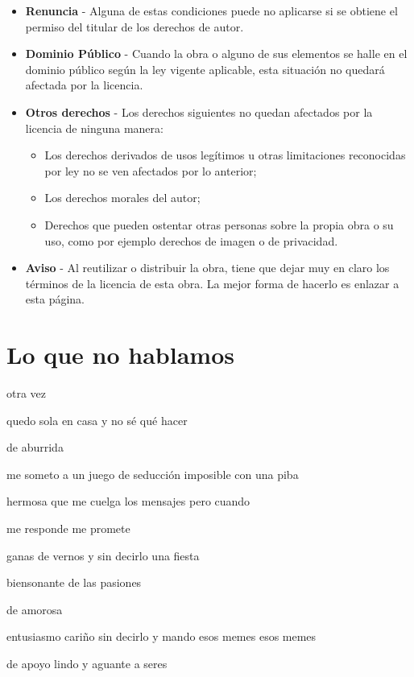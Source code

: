 \documentclass[
]{book}
\begin{document}
\begin{itemize}
\item
  \textbf{Renuncia} - Alguna de estas condiciones puede no aplicarse si se obtiene
  el permiso del titular de los derechos de autor.
\item
  \textbf{Dominio Público} - Cuando la obra o alguno de sus elementos se halle en
  el dominio público según la ley vigente aplicable, esta situación no quedará
  afectada por la licencia.
\item
  \textbf{Otros derechos} - Los derechos siguientes no quedan afectados por
  la licencia de ninguna manera:

  \begin{itemize}
  \item
    Los derechos derivados de usos legítimos u otras limitaciones
    reconocidas por ley no se ven afectados por lo anterior;
  \item
    Los derechos morales del autor;
  \item
    Derechos que pueden ostentar otras personas sobre la propia obra o
    su uso, como por ejemplo derechos de imagen o de privacidad.
  \end{itemize}
\item
  \textbf{Aviso} - Al reutilizar o distribuir la obra, tiene que dejar muy en claro
  los términos de la licencia de esta obra. La mejor forma de hacerlo es
  enlazar a esta página.
\end{itemize}

\hypertarget{lqnh}{%
\chapter{Lo que no hablamos}\label{lqnh}}

otra vez

quedo sola en casa y no sé qué hacer

de aburrida

me someto a un juego de seducción imposible con una piba

hermosa que me cuelga los mensajes pero cuando

me responde me promete

ganas de vernos y sin decirlo una fiesta

biensonante de las pasiones

de amorosa

entusiasmo cariño sin decirlo y mando esos memes esos memes

de apoyo lindo y aguante a seres
\end{document}
